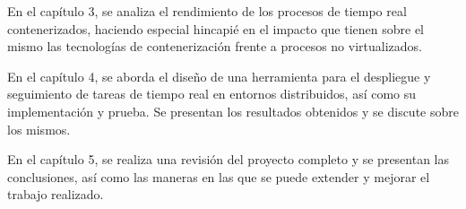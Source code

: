 En el capítulo 3, se analiza el rendimiento de los procesos de tiempo real
contenerizados, haciendo especial hincapié en el impacto que tienen sobre el
mismo las tecnologías de contenerización frente a procesos no virtualizados.

En el capítulo 4, se aborda el diseño de una herramienta para el despliegue y
seguimiento de tareas de tiempo real en entornos distribuidos, así como su
implementación y prueba. Se presentan los resultados obtenidos y se discute
sobre los mismos.

En el capítulo 5, se realiza una revisión del proyecto completo y se presentan
las conclusiones, así como las maneras en las que se puede extender y mejorar el
trabajo realizado.
